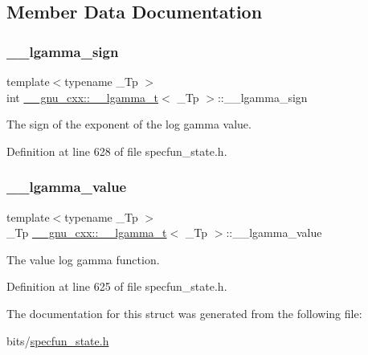 \subsection{Member Data Documentation}
\mbox{\label{struct____gnu__cxx_1_1____lgamma__t_a8aecdc9e5f69e729e96dc50f0c57b331}} 
\subsubsection{\texorpdfstring{\+\_\+\+\_\+lgamma\+\_\+sign}{\_\_lgamma\_sign}}
{\footnotesize\ttfamily template$<$typename \+\_\+\+Tp $>$ \\
int \hyperlink{struct____gnu__cxx_1_1____lgamma__t}{\+\_\+\+\_\+gnu\+\_\+cxx\+::\+\_\+\+\_\+lgamma\+\_\+t}$<$ \+\_\+\+Tp $>$\+::\+\_\+\+\_\+lgamma\+\_\+sign}



The sign of the exponent of the log gamma value. 



Definition at line 628 of file specfun\+\_\+state.\+h.

\mbox{\label{struct____gnu__cxx_1_1____lgamma__t_a916af5560acafd8dcf25c42fd28deef5}} 
\subsubsection{\texorpdfstring{\+\_\+\+\_\+lgamma\+\_\+value}{\_\_lgamma\_value}}
{\footnotesize\ttfamily template$<$typename \+\_\+\+Tp $>$ \\
\+\_\+\+Tp \hyperlink{struct____gnu__cxx_1_1____lgamma__t}{\+\_\+\+\_\+gnu\+\_\+cxx\+::\+\_\+\+\_\+lgamma\+\_\+t}$<$ \+\_\+\+Tp $>$\+::\+\_\+\+\_\+lgamma\+\_\+value}



The value log gamma function. 



Definition at line 625 of file specfun\+\_\+state.\+h.



The documentation for this struct was generated from the following file\+:\begin{DoxyCompactItemize}
\item 
bits/\hyperlink{specfun__state_8h}{specfun\+\_\+state.\+h}\end{DoxyCompactItemize}
